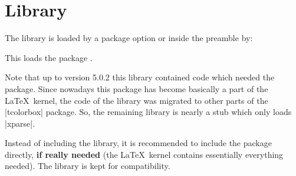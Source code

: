 \clearpage
\section{Library }\label{sec:xparse}%
%
The library is loaded by a package option or inside the preamble by:
\begin{dispListing}
\end{dispListing}
This loads the package  \cite{latexproject:xparse}.

Note that up to version 5.0.2 this library contained code which
needed the  package. Since nowadays this package has become
basically a part of the \LaTeX\ kernel, the code of the library was
migrated to other parts of the |tcolorbox| package. So, the remaining
library is nearly a stub which only loads |xparse|.

Instead of including the  library, it is recommended to include the
 package directly, \textbf{if really needed} (the \LaTeX\ kernel contains
essentially everything needed). The library is kept for compatibility.
